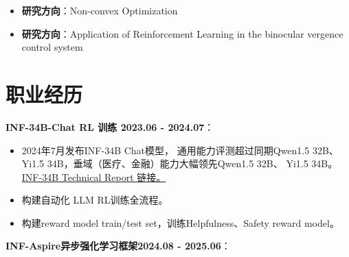 \documentclass{resume}
\begin{document}
\begin{itemize} [parsep=1ex]
  \item \textbf{研究方向}：Non-convex Optimization
\end{itemize}


\begin{itemize} [parsep=1ex]
  \item \textbf{研究方向}：Application of Reinforcement Learning in the binocular vergence control system
\end{itemize}


\vspace{4mm}

\section{职业经历}



\textbf{INF-34B-Chat RL 训练 2023.06 - 2024.07}：
\begin{itemize}[parsep=0.5ex]
  \item 2024年7月发布INF-34B Chat模型， 通用能力评测超过同期Qwen1.5 32B、 Yi1.5 34B，垂域（医疗、金融）能力大幅领先Qwen1.5 32B、 Yi1.5 34B。\href{https://github.com/infly-ai/INF-LLM/}{INF-34B Technical Report 链接。}
  \item 构建自动化 LLM RL训练全流程。 
  \item   构建reward model train/test set，训练Helpfulness、Safety reward model。
  
\end{itemize}

\textbf{INF-Aspire异步强化学习框架2024.08 - 2025.06}：
\end{document}
